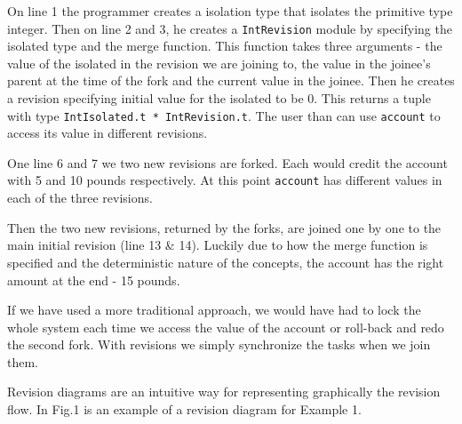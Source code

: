 \documentclass[12pt,twoside,notitlepage]{report}
\begin{document}
 
On line 1 the programmer creates a isolation type that isolates the primitive type integer. Then on line 2 and 3, he creates a {\tt IntRevision} module by specifying the isolated type and the merge function. This function takes three arguments - the value of the isolated in the revision we are joining to, the value in the joinee's parent at the time of the fork and the current value in the joinee. Then he creates a revision specifying initial value for the isolated to be 0. This returns a tuple with type {\tt IntIsolated.t * IntRevision.t}. The user than can use {\tt account} to access its value in different revisions. 

One line 6 and 7 we two new revisions are forked. Each would credit the account with 5 and 10 pounds respectively. At this point {\tt account} has different values in each of the three revisions.

Then the two new revisions, returned by the forks, are joined one by one to the main initial revision (line 13 \& 14). Luckily due to how the merge function is specified and the deterministic nature of the concepts, the account has the right amount at the end - 15 pounds.

If we have used a more traditional approach, we would have had to lock the whole system each time we access the value of the account or roll-back and redo the second fork. With revisions we simply synchronize the tasks when we join them.

Revision diagrams are an intuitive way for representing graphically the revision flow. In Fig.1 is an example of a revision diagram for Example 1. 

 
\end{document}
